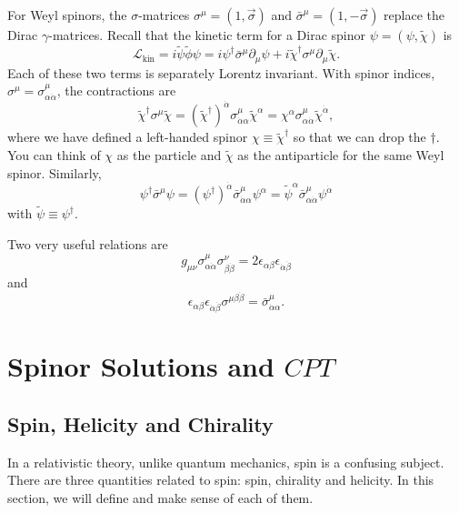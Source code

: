 \documentclass[11pt]{article}
\theoremstyle{definition}
\begin{document}
For Weyl spinors, the \(\sigma\)-matrices \(\sigma^{\mu} = (1, \vec{\sigma})\) and \(\bar{\sigma}^{\mu} = (1, -\vec{\sigma})\) replace the Dirac \(\gamma\)-matrices. Recall that the kinetic term for a Dirac spinor \(\psi = (\psi, \tilde{\chi})\) is
\begin{equation}
\mathcal{L}_{\text{kin}} = i\tilde{\psi}\tilde{\phi}\psi = i\psi^{\dagger}\bar{\sigma}^{\mu}\partial_{\mu}\psi + i\tilde{\chi}^{\dagger}\sigma^{\mu}\partial_{\mu}\tilde{\chi}.
\end{equation}
Each of these two terms is separately Lorentz invariant. With spinor indices, \(\sigma^{\mu} = \sigma^{\mu}_{\alpha\dot{\alpha}}\), the contractions are
\begin{equation}
\tilde{\chi}^{\dagger}\sigma^{\mu}\tilde{\chi} = (\tilde{\chi}^{\dagger})^{\dot{\alpha}}\sigma^{\mu}_{\dot{\alpha}\alpha}\tilde{\chi}^{\alpha} = \chi^{\alpha}\sigma^{\mu}_{\alpha\dot{\alpha}}\tilde{\chi}^{\dot{\alpha}},
\end{equation}
where we have defined a left-handed spinor \(\chi \equiv \tilde{\chi}^{\dagger}\) so that we can drop the \(\dagger\). You can think of \(\chi\) as the particle and \(\tilde{\chi}\) as the antiparticle for the same Weyl spinor. Similarly,
\begin{equation}
\psi^{\dagger}\bar{\sigma}^{\mu}\psi = (\psi^{\dagger})^{\dot{\alpha}}\bar{\sigma}^{\mu}_{\dot{\alpha}\alpha}\psi^{\alpha} = \tilde{\psi}^{\alpha}\bar{\sigma}^{\mu}_{\alpha\dot{\alpha}}\psi^{\dot{\alpha}}
\end{equation}
with \(\tilde{\psi} \equiv \psi^{\dagger}\).

Two very useful relations are
\begin{equation}
g_{\mu\nu}\sigma^{\mu}_{\alpha\dot{\alpha}}\sigma^{\nu}_{\beta\dot{\beta}} = 2\epsilon_{\alpha\beta}\epsilon_{\dot{\alpha}\dot{\beta}}
\end{equation}
and
\begin{equation}
\epsilon_{\alpha\beta}\epsilon_{\dot{\alpha}\dot{\beta}}\sigma^{\mu\beta\dot{\beta}} = \bar{\sigma}^{\mu}_{\dot{\alpha}\alpha}.
\end{equation}

\section{Spinor Solutions and $CPT$}
\subsection{Spin, Helicity and Chirality}
In a relativistic theory, unlike quantum mechanics, spin is a confusing subject. There are three quantities related to spin: spin, chirality and helicity. In this section, we will define and make sense of each of them.
\end{document}
